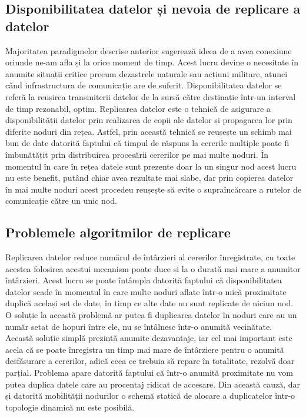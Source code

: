 \documentclass[12pt,a4paper]{report}
\begin{document}
\subsection{Disponibilitatea datelor și nevoia de replicare a datelor}
Majoritatea paradigmelor descrise anterior sugerează ideea de a avea conexiune oriunde ne-am afla și la orice moment de timp. Acest lucru devine o necesitate în anumite situații critice precum dezastrele naturale sau acțiuni militare, atunci când infrastructura de comunicație are de suferit. Disponibilitatea datelor se referă la reușirea transmiterii datelor de la sursă către destinație într-un interval de timp rezonabil, optim. Replicarea datelor este o tehnică de asigurare a disponibilității datelor prin realizarea de copii ale datelor și propagarea lor prin diferite noduri din rețea. Astfel, prin această tehnică se reușește un schimb mai bun de date datorită faptului că timpul de răspuns la cererile multiple poate fi îmbunătățit prin distribuirea procesării cererilor pe mai multe noduri. În momentul în care în rețea datele sunt prezente doar la un singur nod acest lucru nu este benefit, putând chiar avea rezultate mai slabe, dar prin copierea datelor în mai multe noduri acest procedeu reușește să evite o supraîncărcare a rutelor de comunicație către un unic nod. 
\subsection{Problemele algoritmilor de replicare}
Replicarea datelor reduce numărul de întârzieri al cererilor înregistrate, cu toate acestea folosirea acestui mecanism poate duce și la o durată mai mare a anumitor întârzieri. Acest lucru se poate întâmpla datorită faptului că disponibilitatea datelor scade în momentul în care multe noduri aflate într-o mică proximitate duplică același set de date, în timp ce alte date nu sunt replicate de niciun nod. O soluție la această problemă ar putea fi duplicarea datelor în noduri care au un număr setat de hopuri între ele, nu se întâlnesc într-o anumită vecinătate. Această soluție simplă prezintă anumite dezavantaje, iar cel mai important este acela că se poate înregistra un timp mai mare de întârziere pentru o anumită desfășurare a cererilor, adică ceea ce trebuia să repare în totalitate, rezolvă doar parțial. Problema apare datorită faptului că într-o anumită proximitate nu vom putea duplica datele care au procentaj ridicat de accesare. Din această cauză, dar și datorită mobilității nodurilor o schemă statică de alocare a duplicatelor într-o topologie dinamică nu este posibilă.
\end{document}
